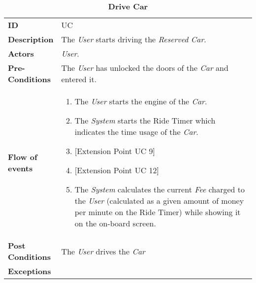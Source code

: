 \begin{longtable}{|p{0.2\linewidth} p{0.8\linewidth}|}
	\captionsetup{labelformat=empty} %
	\caption{\textbf{Drive Car}} %
	\label{UC_DriveCar}%
	\\ \hline %
	
	\textbf{ID} & UC\theUseCaseIdCounter \\ \hline
	\textbf{Description} & The \emph{User} starts driving the \emph{Reserved} \emph{Car}. \\ \hline
	\textbf{Actors} & \emph{User}.\\ \hline
	\textbf{Pre-Conditions} & The \emph{User} has unlocked the doors of the \emph{Car} and entered it. \\ \hline
	\textbf{Flow of events} & 
	\begin{enumerate}
		\item The \emph{User} starts the engine of the \emph{Car}.
		\item The \emph{System} starts the Ride Timer which indicates the time usage of the \emph{Car}.
		\item {[}Extension Point UC 9{]}
		\item {[}Extension Point UC 12{]}
		\item The \emph{System} calculates the current \emph{Fee} charged to the \emph{User} (calculated as a given amount of money per minute on the Ride Timer) while showing it on the on-board screen.
	\end{enumerate}	 \\ \hline
	\textbf{Post Conditions} & The \emph{User} drives the \emph{Car} \\ \hline
	\textbf{Exceptions} & \\ \hline
\end{longtable}

